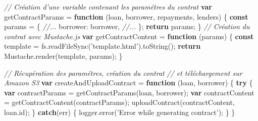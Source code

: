 \documentclass[12pt,a4paper]{article}
\newenvironment{Shaded}{}{}
\newcommand{\KeywordTok}[1]{\textcolor[rgb]{0.00,0.44,0.13}{\textbf{{#1}}}}
\newcommand{\DataTypeTok}[1]{\textcolor[rgb]{0.56,0.13,0.00}{{#1}}}
\newcommand{\StringTok}[1]{\textcolor[rgb]{0.25,0.44,0.63}{{#1}}}
\newcommand{\CommentTok}[1]{\textcolor[rgb]{0.38,0.63,0.69}{\textit{{#1}}}}
\newcommand{\VariableTok}[1]{\textcolor[rgb]{0.10,0.09,0.49}{{#1}}}
\newcommand{\ControlFlowTok}[1]{\textcolor[rgb]{0.00,0.44,0.13}{\textbf{{#1}}}}
\newcommand{\OperatorTok}[1]{\textcolor[rgb]{0.40,0.40,0.40}{{#1}}}
\newcommand{\AttributeTok}[1]{\textcolor[rgb]{0.49,0.56,0.16}{{#1}}}
\newcommand{\NormalTok}[1]{{#1}}
\begin{document}
  \begin{Shaded}
  \begin{Highlighting}[]
  \CommentTok{// Création d'une variable contenant les paramétres du contrat}
  \KeywordTok{var} \NormalTok{getContractParams }\OperatorTok{=} \KeywordTok{function} \NormalTok{(loan}\OperatorTok{,} \NormalTok{borrower}\OperatorTok{,} \NormalTok{repayments}\OperatorTok{,} \NormalTok{lenders) }\OperatorTok{\{}
    \KeywordTok{const} \NormalTok{params }\OperatorTok{=} \OperatorTok{\{}
      \CommentTok{//...}
      \DataTypeTok{borrower}\OperatorTok{:} \NormalTok{borrower}\OperatorTok{,}
      \CommentTok{//...}
    \OperatorTok{\};}
    \ControlFlowTok{return} \NormalTok{params}\OperatorTok{;}
  \OperatorTok{\}}
  \CommentTok{// Création du contrat avec Mustache.js}
  \KeywordTok{var} \NormalTok{getContractContent }\OperatorTok{=} \KeywordTok{function} \NormalTok{(params) }\OperatorTok{\{}
    \KeywordTok{const} \NormalTok{template }\OperatorTok{=} \VariableTok{fs}\NormalTok{.}\AttributeTok{readFileSync}\NormalTok{(}\StringTok{'template.html'}\NormalTok{).}\AttributeTok{toString}\NormalTok{()}\OperatorTok{;}
    \ControlFlowTok{return} \VariableTok{Mustache}\NormalTok{.}\AttributeTok{render}\NormalTok{(template}\OperatorTok{,} \NormalTok{params)}\OperatorTok{;}
  \OperatorTok{\}}

  \CommentTok{// Récupération des paramétres, création du contrat}
  \CommentTok{// et téléchargement sur Amazon S3}
  \KeywordTok{var} \NormalTok{createAndUploadContract }\OperatorTok{=} \KeywordTok{function} \NormalTok{(loan}\OperatorTok{,} \NormalTok{borrower) }\OperatorTok{\{}
    \ControlFlowTok{try} \OperatorTok{\{}
      \KeywordTok{var} \NormalTok{contractParams }\OperatorTok{=} \AttributeTok{getContractParams}\NormalTok{(loan}\OperatorTok{,} \NormalTok{borrower)}\OperatorTok{;}
      \KeywordTok{var} \NormalTok{contractContent }\OperatorTok{=} \AttributeTok{getContractContent}\NormalTok{(contractParams)}\OperatorTok{;}
      \AttributeTok{uploadContract}\NormalTok{(contractContent}\OperatorTok{,} \VariableTok{loan}\NormalTok{.}\AttributeTok{id}\NormalTok{)}\OperatorTok{;}
    \OperatorTok{\}} \ControlFlowTok{catch}\NormalTok{(err) }\OperatorTok{\{}
      \VariableTok{logger}\NormalTok{.}\AttributeTok{error}\NormalTok{(}\StringTok{'Error while generating contract'}\NormalTok{)}\OperatorTok{;}
    \OperatorTok{\}}
  \OperatorTok{\}}
  \end{Highlighting}
  \end{Shaded}

  \bigskip
\end{document}
